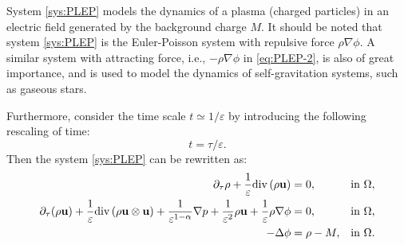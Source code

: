 \documentclass[11pt]{article}
\theoremstyle{plain}
\theoremstyle{definition}
\theoremstyle{remark}
\newcommand{\dtau}{\partial_\tau}
\newcommand{\dv}{\mathrm{div}\, }
\renewcommand{\vec}[1]{{\bf #1}}
\numberwithin{equation}{section}
\begin{document}
System \eqref{sys:PLEP} models the dynamics of a plasma (charged particles) in an electric field generated by the background charge $ M $. It should be noted that system \eqref{sys:PLEP} is the Euler-Poisson system with repulsive force $\rho \nabla\phi$. A similar system with attracting force, i.e., $ - \rho \nabla \phi$ in \eqref{eq:PLEP-2}, is also of great importance, and is used to model the dynamics of self-gravitation systems, such as gaseous stars. 

Furthermore, consider the time scale $ t \simeq 1/\varepsilon $ by introducing the following rescaling of time:
\begin{equation}
    \label{eq:rescale-time}
    t =  \tau/\varepsilon.
\end{equation}
Then the system \eqref{sys:PLEP} can be rewritten as:
\begin{subequations}
    \label{sys:PLEP-rescaled}
    \begin{align}
        \label{eq:rsPLEP-1}
        \dtau \rho + \frac{1}{\varepsilon}\dv (\rho \vec u) & =0, & \text{in} \ \Omega , \\
        \label{eq:rsPLEP-2} 
        \dtau (\rho \vec u) + \frac{1}{\varepsilon}\dv (\rho \vec u \otimes \vec u) + \frac{1}{\varepsilon^{1-\alpha}} \nabla p + \frac{1}{\varepsilon^2} \rho \vec u + \frac{1}{\varepsilon}\rho \nabla \phi & = 0, & \text{in} \ \Omega , \\
        \label{eq:rsPLEP-3}
        - \Delta \phi & = \rho - M, & \text{in} \ \Omega .
    \end{align}
\end{subequations}

\smallskip 
\end{document}
